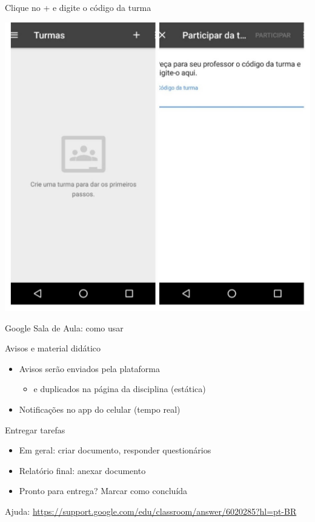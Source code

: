 \documentclass{beamer}
\begin{document}
\begin{frame}{Clique no + e digite o código da turma}
  \begin{center}
    \includegraphics[height=\textheight]{Intro/gclassroom-turma}
  \end{center}
\end{frame}

\begin{frame}{Google Sala de Aula: como usar}
  \begin{block}{Avisos e material didático}
    \begin{itemize}
      \small
    \item Avisos serão enviados pela plataforma
      \begin{itemize}
        \tiny
      \item e duplicados na página da disciplina (estática)
      \end{itemize}
      \smallskip
    \item Notificações no app do celular (tempo real)
    \end{itemize}
  \end{block}
  \begin{block}{Entregar tarefas}
    \small
    \begin{itemize}
      \small
    \item Em geral: criar documento, responder questionários
      \smallskip
    \item Relatório final: anexar documento
      \smallskip
    \item Pronto para entrega? Marcar como concluída
      \bigskip
    \end{itemize}
    \begin{center}
      Ajuda: {\tiny \url{https://support.google.com/edu/classroom/answer/6020285?hl=pt-BR}}
    \end{center}
  \end{block}
\end{frame}
\end{document}
